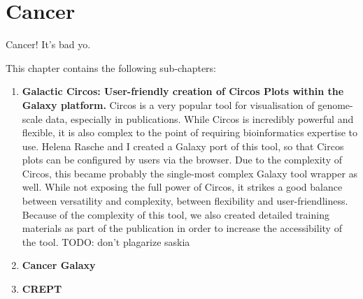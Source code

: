 \cleartorightpage

\chapter{Cancer}\label{chapter:cancer}

\setcounter{figure}{-1}
\setcounter{table}{-1}
\setcounter{section}{-1}

Cancer! It's bad yo.

This chapter contains the following sub-chapters:

\begin{enumerate}[label=\ref{chapter:training}.\arabic*]
\itemsep-0.5em
\setcounter{enumi}{-1}
\item \textbf{Galactic Circos: User-friendly creation of Circos Plots within the Galaxy platform.} Circos is a very popular tool for visualisation of genome-scale data, especially in publications. While Circos is incredibly powerful and flexible, it is also complex to the point of requiring bioinformatics expertise to use. Helena Rasche and I created a Galaxy port of this tool, so that Circos plots can be configured by users via the browser. Due to the complexity of Circos, this became probably the single-most complex Galaxy tool wrapper as well. While not exposing the full power of Circos, it strikes a good balance between versatility and complexity, between flexibility and user-friendliness. Because of the complexity of this tool, we also created detailed training materials as part of the publication in order to increase the accessibility of the tool. TODO: don't plagarize saskia
\item \textbf{Cancer Galaxy}
\item \textbf{CREPT}
\end{enumerate}
